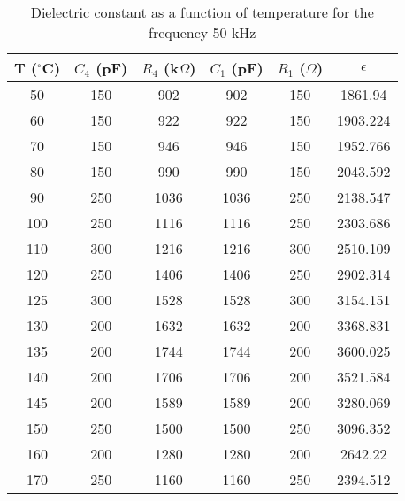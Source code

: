 \begin{table}[H]
    \centering
    \begin{tabular}{|c|c|c|c|c|c|}
    \hline
    T ($^\circ$C) & $C_4$ (pF) & $R_4$ (k$\Omega$) & $C_1$ (pF) & $R_1$ ($\Omega$) & $\epsilon$\\ \hline
    50 & 150 & 902 & 902 & 150 & 1861.94 \\ \hline
60 & 150 & 922 & 922 & 150 & 1903.224 \\ \hline
70 & 150 & 946 & 946 & 150 & 1952.766 \\ \hline
80 & 150 & 990 & 990 & 150 & 2043.592 \\ \hline
90 & 250 & 1036 & 1036 & 250 & 2138.547 \\ \hline
100 & 250 & 1116 & 1116 & 250 & 2303.686 \\ \hline
110 & 300 & 1216 & 1216 & 300 & 2510.109 \\ \hline
120 & 250 & 1406 & 1406 & 250 & 2902.314 \\ \hline
125 & 300 & 1528 & 1528 & 300 & 3154.151 \\ \hline
130 & 200 & 1632 & 1632 & 200 & 3368.831 \\ \hline
135 & 200 & 1744 & 1744 & 200 & 3600.025 \\ \hline
140 & 200 & 1706 & 1706 & 200 & 3521.584 \\ \hline
145 & 200 & 1589 & 1589 & 200 & 3280.069 \\ \hline
150 & 250 & 1500 & 1500 & 250 & 3096.352 \\ \hline
160 & 200 & 1280 & 1280 & 200 & 2642.22 \\ \hline
170 & 250 & 1160 & 1160 & 250 & 2394.512 \\ \hline
    \end{tabular}
    \caption{Dielectric constant as a function
    of temperature for the frequency 50 kHz}
    \label{tab:f4}
    \end{table}